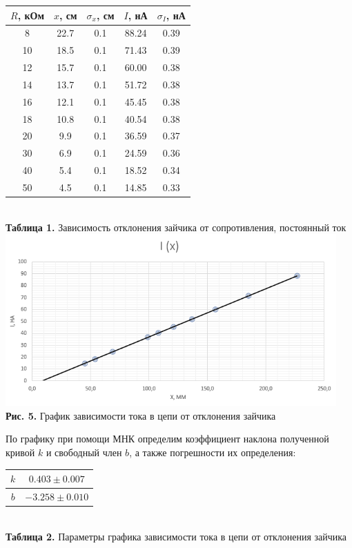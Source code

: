 \documentclass[a4paper,12pt]{article} %
\begin{document}
\begin{center}
\begin{tabular}{|c|c|c|c|c|}\hline
$ R $, кОм & $ x $, см & $ \sigma_x $, см & $ I $, нА & $ \sigma_I $, нА\\\hline
8 & 22.7 & 0.1 & 88.24 & 0.39 \\\hline
10 & 18.5 & 0.1 & 71.43 & 0.39 \\\hline
12 & 15.7 & 0.1 & 60.00 & 0.38 \\\hline
14 & 13.7 & 0.1 & 51.72 & 0.38 \\\hline
16 & 12.1 & 0.1 & 45.45 & 0.38 \\\hline
18 & 10.8 & 0.1 & 40.54 & 0.38 \\\hline
20 & 9.9 & 0.1 & 36.59 & 0.37 \\\hline
30 & 6.9 & 0.1 & 24.59 & 0.36 \\\hline
40 & 5.4 & 0.1 & 18.52 & 0.34 \\\hline
50 & 4.5 & 0.1 & 14.85 & 0.33 \\\hline
\end{tabular} \\
\hfill \break \textbf {Таблица 1.} Зависимость отклонения зайчика от сопротивления, постоянный ток\\
\includegraphics[width=0.95\textwidth]{3.2.6_5.png}\\
\textbf{Рис. 5.} График зависимости тока в цепи от отклонения зайчика\\
\end{center}

\hfill \break По графику при помощи МНК определим коэффициент наклона полученной кривой $k$ и свободный член $b$, а также погрешности их определения:

\begin{center}
\begin{tabular}{|c|c|}\hline
$ k $ & $ 0.403 \pm 0.007 $\\\hline
$ b $ & $ -3.258 \pm 0.010 $\\\hline
\end{tabular} \\
\hfill \break \textbf {Таблица 2.} Параметры графика зависимости тока в цепи от отклонения зайчика\\
\end{center}
\end{document}
